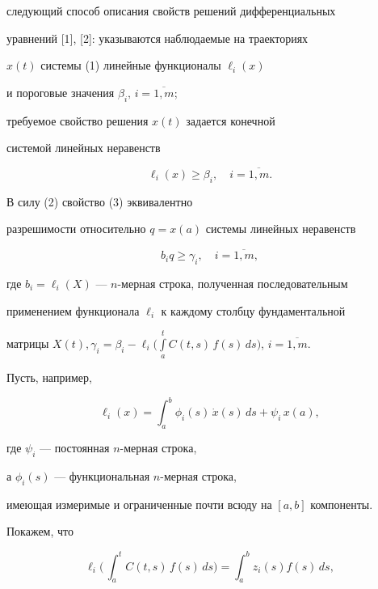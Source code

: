 следующий способ описания свойств решений дифференциальных


уравнений [1], [2]: указываются наблюдаемые на траекториях


$x(t)$ системы (1) линейные функционалы $\ell_i(x)$


и пороговые значения $\beta_i,\,i=\overline{1,m}$;


требуемое свойство решения $x(t)$ задается конечной


системой линейных неравенств


\begin{equation}


\ell_i(x)\ge\beta_i,\quad i=\overline{1,m}. %


\end{equation}





В силу (2) свойство (3) эквивалентно


разрешимости относительно $q=x(a)$  системы линейных неравенств


\begin{equation}


b_iq\ge\gamma_i,\quad i=\overline{1,m}, %


\end{equation}


где $b_i=\ell_i(X)$ --- $n$-мерная строка, полученная последовательным


применением функционала $\ell_i$ к каждому столбцу фундаментальной


матрицы $X(t),\gamma_i=\beta_i-\ell_i\Big(


\int\limits_a^t C(t,s)\,f(s)\,ds\Big)$, $i=\overline{1,m}$.





Пусть, например,


$$


\ell_i(x)=\int_a^b\phi_i(s)\,\Dot x(s)\,ds+\psi_i\,x(a),


$$


где $\psi_i$ --- постоянная $n$-мерная строка,


а $\phi_i(s)$ --- функциональная $n$-мерная строка,


имеющая измеримые и ограниченные почти всюду на $[a,b]$ компоненты.


Покажем, что


\begin{equation}


\ell_i\bigg(\,\int_a^t C(t,s)\,f(s)\,ds\bigg)=\int_a^b z_i(s)f(s)\,ds,%


\end{equation}


